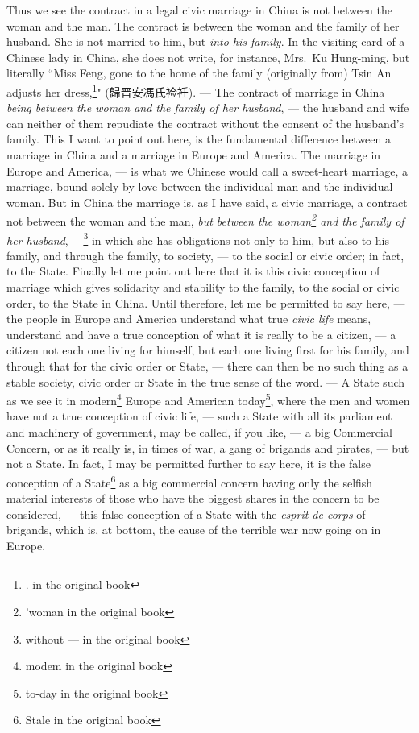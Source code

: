Thus we see the contract in a legal civic marriage in China is not between the woman and the man.
The contract is between the woman and the family of her husband.
She is not married to him, but \emph{into his family}.
In the visiting card of a Chinese lady in China, she does not write, for instance, Mrs.~Ku Hung-ming, but literally ``Miss Feng, gone to the home of the family (originally from) Tsin An adjusts her dress,\footnote{. in the original book}" (歸晋安馮氏裣衽).
--- The contract of marriage in China \emph{being between the woman and the family of her husband}, --- the husband and wife can neither of them repudiate the contract without the consent of the husband's family.
This I want to point out here, is the fundamental difference between a marriage in China and a marriage in Europe and America.
The marriage in Europe and America, --- is what we Chinese would call a sweet-heart marriage, a marriage, bound solely by love between the individual man and the individual woman.
But in China the marriage is, as I have said, a civic marriage, a contract not between the woman and the man, \emph{but between the woman\footnote{'woman in the original book} and the family of her husband}, ---\footnote{without --- in the original book} in which she has obligations not only to him, but also to his family, and through the family, to society, --- to the social or civic order; in fact, to the State.
Finally let me point out here that it is this civic conception of marriage which gives solidarity and stability to the family, to the social or civic order, to the State in China. 
Until therefore, let me be permitted to say here, --- the people in Europe and America understand what true \emph{civic life} means, understand and have a true conception of what it is really to be a citizen, --- a citizen not each one living for himself, but each one living first for his family, and through that for the civic order or State, --- there can then be no such thing as a stable society, civic order or State in the true sense of the word.
--- A State such as we see it in modern\footnote{modem in the original book} Europe and American today\footnote{to-day in the original book}, where the men and women have not a true conception of civic life, --- such a State with all its parliament and machinery of government, may be called, if you like, --- a big Commercial Concern, or as it really is, in times of war, a gang of brigands and pirates, --- but not a State.
In fact, I may be permitted further to say here, it is the false conception of a State\footnote{Stale in the original book} as a big commercial concern having only the selfish material interests of those who have the biggest shares in the concern to be considered, --- this false conception of a State with the \emph{esprit de corps}  of brigands, which is, at bottom, the cause of the terrible war now going on in Europe.
